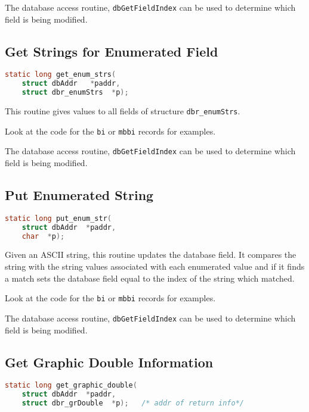 The database access routine, \verb|dbGetFieldIndex| can be used to determine which field is being modified.

\subsection{Get Strings for Enumerated Field}

\begin{lstlisting}[language=C]
static long get_enum_strs(
    struct dbAddr   *paddr,
    struct dbr_enumStrs  *p);
\end{lstlisting}

This routine gives values to all fields of structure \verb|dbr_enumStrs|.

Look at the code for the \verb|bi| or \verb|mbbi| records for examples.

The database access routine, \verb|dbGetFieldIndex| can be used to determine which field is being modified.

\subsection{Put Enumerated String}

\begin{lstlisting}[language=C]
static long put_enum_str(
    struct dbAddr  *paddr,
    char  *p);
\end{lstlisting}

Given an ASCII string, this routine updates the database field.
It compares the string with the string values associated with each enumerated value and if it finds a match sets the database field equal to the index of the string which matched.

Look at the code for the \verb|bi| or \verb|mbbi| records for examples.

The database access routine, \verb|dbGetFieldIndex| can be used to determine which field is being modified.

\subsection{Get Graphic Double Information}

\begin{lstlisting}[language=C]
static long get_graphic_double(
    struct dbAddr  *paddr,
    struct dbr_grDouble  *p);   /* addr of return info*/
\end{lstlisting}


